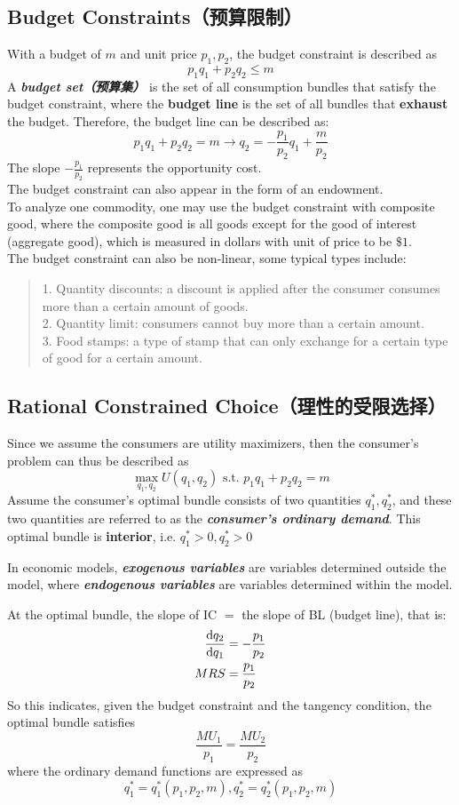 \subsection{Budget Constraints（预算限制）}
With a budget of $m$ and unit price $p_1, p_2$, the budget constraint is described as
$$p_1q_1 + p_2q_2 \le m$$
A \textbf{\textit{budget set（预算集）}} is the set of all consumption bundles that satisfy the budget constraint, where the \textbf{budget line} is the set of all bundles that \textbf{exhaust} the budget. Therefore, the budget line can be described as:
$$p_1q_1 + p_2q_2 = m \to q_2 = -\frac{p_1}{p_2}q_1 + \frac{m}{p_2}$$
The slope $-\frac{p_1}{p_2}$ represents the opportunity cost. \\
The budget constraint can also appear in the form of an endowment. \\
To analyze one commodity, one may use the budget constraint with composite good, where the composite good is all goods except for the good of interest (aggregate good), which is measured in dollars with unit of price to be $\$1$. \\
The budget constraint can also be non-linear, some typical types include:
\begin{quote}
    1. Quantity discounts: a discount is applied after the consumer consumes more than a certain amount of goods. \\
    2. Quantity limit: consumers cannot buy more than a certain amount. \\
    3. Food stamps: a type of stamp that can only exchange for a certain type of good for a certain amount.
\end{quote}

\subsection{Rational Constrained Choice（理性的受限选择）}
Since we assume the consumers are utility maximizers, then the consumer's problem can thus be described as 
$$\max_{q_1, q_2}U(q_1, q_2) \text{ s.t. } p_1q_1 + p_2q_2 = m$$
Assume the consumer's optimal bundle consists of two quantities $q_1^{*}, q_2^{*}$, and these two quantities are referred to as the \textbf{\textit{consumer's ordinary demand}}. This optimal bundle is \textbf{interior}, i.e. $q_1^{*} > 0, q_2^{*} > 0$
\begin{definition}
    In economic models, \textbf{\textit{exogenous variables}} are variables determined outside the model, where \textbf{\textit{endogenous variables}} are variables determined within the model.
\end{definition}
At the optimal bundle, the slope of IC $=$ the slope of BL (budget line), that is:
\begin{align*}
    \dv{q_2}{q_1} &= -\frac{p_1}{p_2} \\
    MRS &= \frac{p_1}{p_2}
\end{align*}
So this indicates, given the budget constraint and the tangency condition, the optimal bundle satisfies
$$\frac{MU_1}{p_1} = \frac{MU_2}{p_2}$$
where the ordinary demand functions are expressed as
$$q_1^{*} = q_1^{*}(p_1, p_2, m), q_2^{*} = q_2^{*}(p_1, p_2, m)$$

